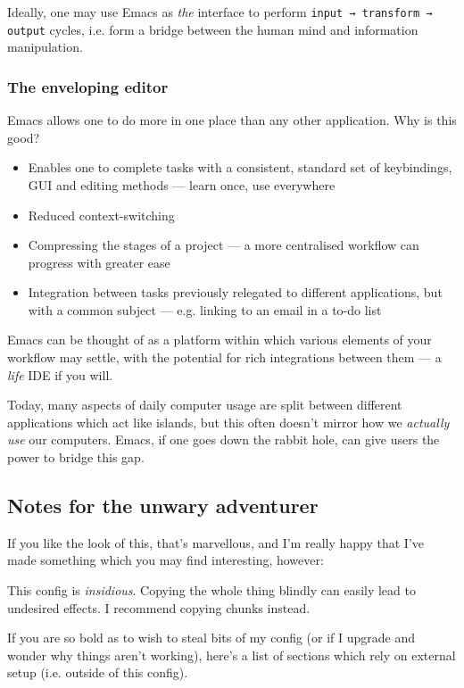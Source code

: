 \documentclass{scrartcl}
\begin{document}
Ideally, one may use Emacs as \emph{the} interface to perform \texttt{input → transform →
output} cycles, i.e. form a bridge between the human mind and information
manipulation.

\subsubsection{The enveloping editor}
\label{sec:org39a483b}
Emacs allows one to do more in one place than any other application. Why is this
good?
\begin{itemize}
\item Enables one to complete tasks with a consistent, standard set of keybindings,
GUI and editing methods --- learn once, use everywhere
\item Reduced context-switching
\item Compressing the stages of a project --- a more centralised workflow can progress
with greater ease
\item Integration between tasks previously relegated to different applications, but
with a common subject --- e.g. linking to an email in a to-do list
\end{itemize}

Emacs can be thought of as a platform within which various elements of your
workflow may settle, with the potential for rich integrations between them --- a
\emph{life} IDE if you will.

Today, many aspects of daily computer usage are split between different
applications which act like islands, but this often doesn't mirror how we
\emph{actually use} our computers. Emacs, if one goes down the rabbit hole, can give
users the power to bridge this gap.

\subsection{Notes for the unwary adventurer}
\label{sec:org5023230}
If you like the look of this, that's marvellous, and I'm really happy that I've
made something which you may find interesting, however:
\begin{warning}
This config is \emph{insidious}. Copying the whole thing blindly can easily lead to
undesired effects. I recommend copying chunks instead.
\end{warning}

If you are so bold as to wish to steal bits of my config (or if I upgrade and
wonder why things aren't working), here's a list of sections which rely on
external setup (i.e. outside of this config).
\end{document}
